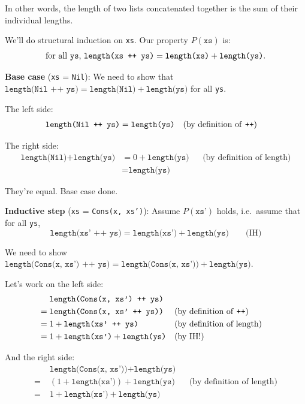 \documentclass[11pt]{article}
\begin{document}
In other words, the length of two lists concatenated together is the sum of their individual lengths.

We'll do structural induction on \texttt{xs}. Our property $P(\texttt{xs})$ is:
\[
\text{for all \texttt{ys}, } \texttt{length(xs ++ ys)} = \texttt{length(xs)} + \texttt{length(ys)}.
\]

\textbf{Base case} (\texttt{xs} = \texttt{Nil}): We need to show that $\texttt{length(Nil ++ ys)} = \texttt{length(Nil)} + \texttt{length(ys)}$ for all \texttt{ys}.

The left side:
\begin{align*}
\texttt{length(Nil ++ ys)} &= \texttt{length(ys)} && \text{(by definition of \texttt{++})}
\end{align*}

The right side:
\begin{align*}
\texttt{length(Nil)} + \texttt{length(ys)} &= 0 + \texttt{length(ys)} && \text{(by definition of length)} \\
&= \texttt{length(ys)}
\end{align*}

They're equal. Base case done.

\textbf{Inductive step} (\texttt{xs} = \texttt{Cons(x, xs')}): Assume $P(\texttt{xs'})$ holds, i.e.\ assume that for all \texttt{ys},
\[
\texttt{length(xs' ++ ys)} = \texttt{length(xs')} + \texttt{length(ys)} \qquad \text{(IH)}
\]

We need to show $\texttt{length(Cons(x, xs') ++ ys)} = \texttt{length(Cons(x, xs'))} + \texttt{length(ys)}$.

Let's work on the left side:
\begin{align*}
&\texttt{length(Cons(x, xs') ++ ys)} \\
= \;&\texttt{length(Cons(x, xs' ++ ys))} && \text{(by definition of \texttt{++})} \\
= \;&1 + \texttt{length(xs' ++ ys)} && \text{(by definition of length)} \\
= \;&1 + \texttt{length(xs')} + \texttt{length(ys)} && \text{(by IH!)}
\end{align*}

And the right side:
\begin{align*}
&\texttt{length(Cons(x, xs'))} + \texttt{length(ys)} \\
= \;&(1 + \texttt{length(xs')}) + \texttt{length(ys)} && \text{(by definition of length)} \\
= \;&1 + \texttt{length(xs')} + \texttt{length(ys)}
\end{align*}
\end{document}
